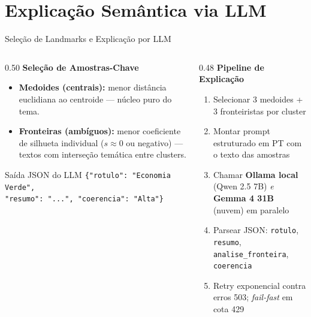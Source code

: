\documentclass[aspectratio=169]{beamer}
\begin{document}
\section{Explicação Semântica via LLM}
\begin{frame}{Seleção de Landmarks e Explicação por LLM}
  \begin{columns}[T]
    \begin{column}{0.50\textwidth}
      \textbf{\color{ufrnblue}Seleção de Amostras-Chave}
      \begin{itemize}
        \item \textbf{Medoides (centrais):} menor distância euclidiana ao
              centroide — núcleo puro do tema.
        \item \textbf{Fronteiras (ambíguos):} menor coeficiente de silhueta
              individual ($s \approx 0$ ou negativo) — textos com interseção
              temática entre clusters.
      \end{itemize}
      \vspace{0.4em}
      \begin{exampleblock}{\small Saída JSON do LLM}
        \tiny\texttt{\{"rotulo": "Economia Verde",\\
        "resumo": "...", "coerencia": "Alta"\}}
      \end{exampleblock}
    \end{column}
    \begin{column}{0.48\textwidth}
      \textbf{\color{ufrnblue}Pipeline de Explicação}
      \begin{enumerate}\small
        \item Selecionar 3 medoides + 3 fronteiristas por cluster
        \item Montar prompt estruturado em PT com o texto das amostras
        \item Chamar \textbf{Ollama local} (Qwen 2.5 7B) \emph{e}
              \textbf{Gemma 4 31B} (nuvem) em paralelo
        \item Parsear JSON: \texttt{rotulo}, \texttt{resumo},
              \texttt{analise\_fronteira}, \texttt{coerencia}
        \item Retry exponencial contra erros 503; \textit{fail-fast} em cota 429
      \end{enumerate}
    \end{column}
  \end{columns}
\end{frame}
\end{document}
